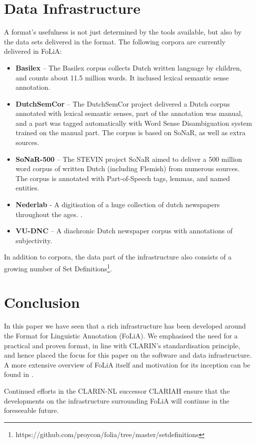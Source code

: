 \documentclass[a4paper,10pt,twoside]{article}
\begin{document}
\section{Data Infrastructure}
\label{sec:datainfrastructure}

A format's usefulness is not just determined by the tools
available, but also by the data sets delivered in the format.
The following corpora are currently delivered in FoLiA:

\begin{itemize}
    \item \textbf{Basilex} -- The Basilex corpus collects Dutch written language by children,
        and counts about 11.5 million words. It inclused lexical semantic sense
        annotation.\cite{BASILEX}
    \item \textbf{DutchSemCor} -- The DutchSemCor project delivered a Dutch corpus annotated
        with lexical semantic senses, part of the annotation was manual, and a
        part was tagged automatically with Word Sense Disambiguation system trained on
        the manual part. The corpus is based on SoNaR, as well as extra
        sources. \cite{DUTCHSEMCOR}
    \item \textbf{SoNaR-500} --  The STEVIN project SoNaR aimed to deliver a 500 million
        word corpus of written Dutch (including Flemish) from numerous sources.
        The corpus is annotated with Part-of-Speech tags, lemmas, and named
        entities. \cite{StevinSONAR2013}
    \item \textbf{Nederlab} - A digitisation of a huge collection of dutch
        newspapers throughout the ages. \cite{NEDERLAB}.
    \item \textbf{VU-DNC} -- A diachronic Dutch newspaper corpus with annotations of
        subjectivity.\cite{VUDNC}
\end{itemize}

In addition to corpora, the data part of the infrastructure also consists of a
growing number of Set
Definitions\footnote{https://github.com/proycon/folia/tree/master/setdefinitions}.

\section{Conclusion}
\label{sec:conclusion}

In this paper we have seen that a rich infrastructure has been developed around
the Format for Linguistic Annotation (FoLiA). We emphasised the need for a
practical and proven format, in line with CLARIN's standardisation principle,
and hence placed the focus for this paper on the software and data
infrastructure. A more extensive overview of FoLiA itself and motivation for its
inception can be found in \cite{FOLIACLIN2013}.

Continued efforts in the
CLARIN-NL successor CLARIAH ensure that the developments on the infrastructure
surrounding FoLiA will continue in the foreseeable future.


 
  
\end{document}
